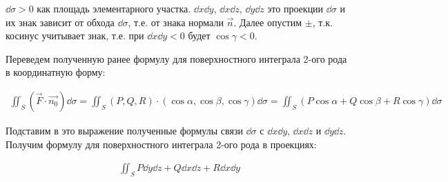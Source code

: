 \begin{remark}
  \(\dd \sigma > 0\) как площадь элементарного участка. \(\dd x \dd y\),
  \(\dd x \dd z\), \(\dd y \dd z\) это проекции \(\dd \sigma\) и их знак
  зависит от обхода \(\dd \sigma\), т.е. от знака нормали \(\vec{n}\). Далее
  опустим \(\pm\), т.к. косинус учитывает знак, т.е. при \(\dd x \dd y < 0\)
  будет \(\cos \gamma < 0\).
\end{remark}

Переведем полученную ранее формулу для поверхностного интеграла 2-ого рода в
координатную форму:

\begin{align*}\label{surf-int-coords}\tag{SIC}
  \iint_{S} (\vec{F} \cdot \vec{n_{0}}) \dd \sigma
  = \iint_{S} (P, Q, R) \cdot (\cos \alpha, \cos \beta, \cos \gamma) \dd \sigma
  = \iint_{S} (P \cos \alpha + Q \cos \beta + R \cos \gamma) \dd \sigma
\end{align*}

Подставим в это выражение полученные формулы связи \(\dd \sigma\) с
\(\dd x \dd y\), \(\dd x \dd z\) и \(\dd y \dd z\). Получим формулу для
поверхностного интеграла 2-ого рода в проекциях:

\begin{align*}\label{surf-int-proj}\tag{SIP}
  \iint_{S} P \dd y \dd z + Q \dd x \dd z + R \dd x \dd y
\end{align*}